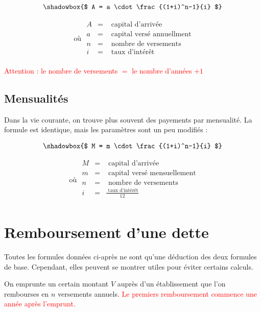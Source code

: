 \begin{equation*}
\shadowbox{$
A = a \cdot \frac{(1+i)^n-1}{i} $}
\end{equation*}

\begin{equation*}
\mbox{ où } 
\begin{array}{lll}
A&=&\mbox{ capital d'arrivée}\\
a&=&\mbox{ capital versé annuellment}\\
n&=&\mbox{ nombre de versements}\\
i&=&\mbox{ taux d'intérêt}\\
\end{array}
\end{equation*}

\textcolor{red}{Attention : le nombre de versements $=$ le nombre d'années $+1$}

\subsection{Mensualités}

Dans la vie courante, on trouve plus souvent des payements par mensualité. La formule est identique, mais les paramètres sont un peu modifiés :

\begin{equation*}
\shadowbox{$
M = m \cdot \frac{(1+i)^n-1}{i} $}
\end{equation*}

\begin{equation*}
\mbox{ où } 
\begin{array}{lll}
M&=&\mbox{ capital d'arrivée}\\
m&=&\mbox{ capital versé mensuellement}\\
n&=&\mbox{ nombre de versements}\\
i&=&\frac{\mbox{ taux d'intérêt}}{12}\\
\end{array}
\end{equation*}

\section{Remboursement d'une dette}

Toutes les formules données ci-après ne sont qu'une déduction des deux formules de base. Cependant, elles peuvent se montrer utiles pour éviter certains calculs.

On emprunte un certain montant $V$ auprès d'un établissement que l'on rembourses en $n$ versements annuels. \textcolor{red}{Le premiers remboursement commence une année après l'emprunt.}


